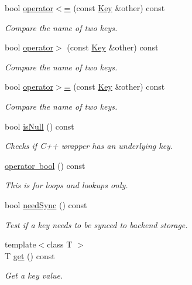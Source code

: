 \begin{DoxyCompactItemize}
bool \mbox{\hyperlink{classkdb_1_1Key_addb92d7d52f80fc0cafa40d60fe0564f}{operator$<$=}} (const \mbox{\hyperlink{classkdb_1_1Key}{Key}} \&other) const
\begin{DoxyCompactList}\small\item\em Compare the name of two keys. \end{DoxyCompactList}\item 
bool \mbox{\hyperlink{classkdb_1_1Key_af616a48861b70b93e6f5955206c9257e}{operator$>$}} (const \mbox{\hyperlink{classkdb_1_1Key}{Key}} \&other) const
\begin{DoxyCompactList}\small\item\em Compare the name of two keys. \end{DoxyCompactList}\item 
bool \mbox{\hyperlink{classkdb_1_1Key_a4e711165a33a127d95f7102307e94bf6}{operator$>$=}} (const \mbox{\hyperlink{classkdb_1_1Key}{Key}} \&other) const
\begin{DoxyCompactList}\small\item\em Compare the name of two keys. \end{DoxyCompactList}\item 
bool \mbox{\hyperlink{classkdb_1_1Key_ab70b89caae5fe1e9a2e774733576fa4c}{is\+Null}} () const
\begin{DoxyCompactList}\small\item\em Checks if C++ wrapper has an underlying key. \end{DoxyCompactList}\item 
\mbox{\hyperlink{classkdb_1_1Key_a15ee99e8447ee526d600e15938e4a1c0}{operator bool}} () const
\begin{DoxyCompactList}\small\item\em This is for loops and lookups only. \end{DoxyCompactList}\item 
bool \mbox{\hyperlink{classkdb_1_1Key_add635e6194c7a05b7d4e470f7b135d9c}{need\+Sync}} () const
\begin{DoxyCompactList}\small\item\em Test if a key needs to be synced to backend storage. \end{DoxyCompactList}\item 
{\footnotesize template$<$class T $>$ }\\T \mbox{\hyperlink{classkdb_1_1Key_ac558a1f1b2cb50d77fbabcbb24950c05}{get}} () const
\begin{DoxyCompactList}\small\item\em Get a key value. \end{DoxyCompactList}\item 

\end{DoxyCompactItemize}
